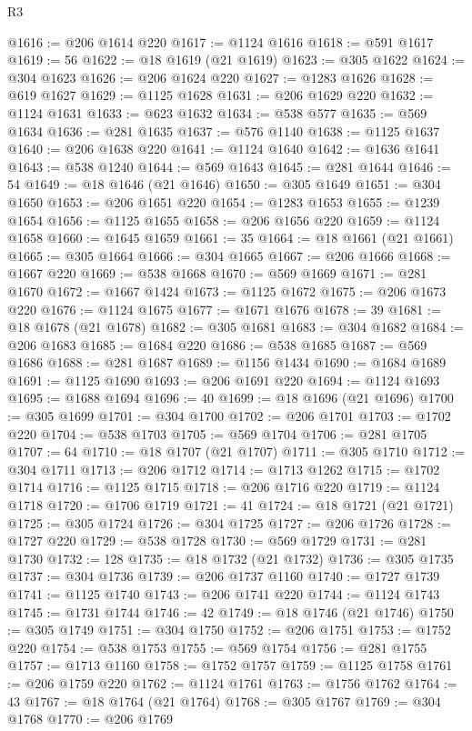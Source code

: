 \begin{lexlean}{R3}
\begin{coremodule}
@1616 := @206 @1614 @220
@1617 := @1124 @1616
@1618 := @591 @1617
@1619 := 56
@1622 := @18 @1619 (@21 @1619)
@1623 := @305 @1622
@1624 := @304 @1623
@1626 := @206 @1624 @220
@1627 := @1283 @1626
@1628 := @619 @1627
@1629 := @1125 @1628
@1631 := @206 @1629 @220
@1632 := @1124 @1631
@1633 := @623 @1632
@1634 := @538 @577
@1635 := @569 @1634
@1636 := @281 @1635
@1637 := @576 @1140
@1638 := @1125 @1637
@1640 := @206 @1638 @220
@1641 := @1124 @1640
@1642 := @1636 @1641
@1643 := @538 @1240
@1644 := @569 @1643
@1645 := @281 @1644
@1646 := 54
@1649 := @18 @1646 (@21 @1646)
@1650 := @305 @1649
@1651 := @304 @1650
@1653 := @206 @1651 @220
@1654 := @1283 @1653
@1655 := @1239 @1654
@1656 := @1125 @1655
@1658 := @206 @1656 @220
@1659 := @1124 @1658
@1660 := @1645 @1659
@1661 := 35
@1664 := @18 @1661 (@21 @1661)
@1665 := @305 @1664
@1666 := @304 @1665
@1667 := @206 @1666
@1668 := @1667 @220
@1669 := @538 @1668
@1670 := @569 @1669
@1671 := @281 @1670
@1672 := @1667 @1424
@1673 := @1125 @1672
@1675 := @206 @1673 @220
@1676 := @1124 @1675
@1677 := @1671 @1676
@1678 := 39
@1681 := @18 @1678 (@21 @1678)
@1682 := @305 @1681
@1683 := @304 @1682
@1684 := @206 @1683
@1685 := @1684 @220
@1686 := @538 @1685
@1687 := @569 @1686
@1688 := @281 @1687
@1689 := @1156 @1434
@1690 := @1684 @1689
@1691 := @1125 @1690
@1693 := @206 @1691 @220
@1694 := @1124 @1693
@1695 := @1688 @1694
@1696 := 40
@1699 := @18 @1696 (@21 @1696)
@1700 := @305 @1699
@1701 := @304 @1700
@1702 := @206 @1701
@1703 := @1702 @220
@1704 := @538 @1703
@1705 := @569 @1704
@1706 := @281 @1705
@1707 := 64
@1710 := @18 @1707 (@21 @1707)
@1711 := @305 @1710
@1712 := @304 @1711
@1713 := @206 @1712
@1714 := @1713 @1262
@1715 := @1702 @1714
@1716 := @1125 @1715
@1718 := @206 @1716 @220
@1719 := @1124 @1718
@1720 := @1706 @1719
@1721 := 41
@1724 := @18 @1721 (@21 @1721)
@1725 := @305 @1724
@1726 := @304 @1725
@1727 := @206 @1726
@1728 := @1727 @220
@1729 := @538 @1728
@1730 := @569 @1729
@1731 := @281 @1730
@1732 := 128
@1735 := @18 @1732 (@21 @1732)
@1736 := @305 @1735
@1737 := @304 @1736
@1739 := @206 @1737 @1160
@1740 := @1727 @1739
@1741 := @1125 @1740
@1743 := @206 @1741 @220
@1744 := @1124 @1743
@1745 := @1731 @1744
@1746 := 42
@1749 := @18 @1746 (@21 @1746)
@1750 := @305 @1749
@1751 := @304 @1750
@1752 := @206 @1751
@1753 := @1752 @220
@1754 := @538 @1753
@1755 := @569 @1754
@1756 := @281 @1755
@1757 := @1713 @1160
@1758 := @1752 @1757
@1759 := @1125 @1758
@1761 := @206 @1759 @220
@1762 := @1124 @1761
@1763 := @1756 @1762
@1764 := 43
@1767 := @18 @1764 (@21 @1764)
@1768 := @305 @1767
@1769 := @304 @1768
@1770 := @206 @1769

\end{coremodule}
\end{lexlean}
